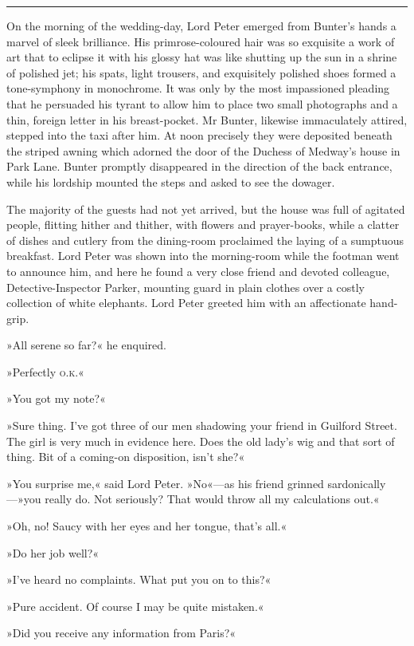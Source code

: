 \noindent\hfil\rule{0.5\textwidth}{.4pt}\hfil 

On the morning of the wedding-day, Lord Peter emerged from Bunter's hands a marvel of sleek brilliance. His primrose-coloured hair was so exquisite a work of art that to eclipse it with his glossy hat was like shutting up the sun in a shrine of polished jet; his spats, light trousers, and exquisitely polished shoes formed a tone-symphony in monochrome. It was only by the most impassioned pleading that he persuaded his tyrant to allow him to place two small photographs and a thin, foreign letter in his breast-pocket. Mr Bunter, likewise immaculately attired, stepped into the taxi after him. At noon precisely they were deposited beneath the striped awning which adorned the door of the Duchess of Medway's house in Park Lane. Bunter promptly disappeared in the direction of the back entrance, while his lordship mounted the steps and asked to see the dowager.

The majority of the guests had not yet arrived, but the house was full of agitated people, flitting hither and thither, with flowers and prayer-books, while a clatter of dishes and cutlery from the dining-room proclaimed the laying of a sumptuous breakfast. Lord Peter was shown into the morning-room while the footman went to announce him, and here he found a very close friend and devoted colleague, Detective-Inspector Parker, mounting guard in plain clothes over a costly collection of white elephants. Lord Peter greeted him with an affectionate hand-grip.

»All serene so far?« he enquired.

»Perfectly \textsc{o.k.}«

»You got my note?«

»Sure thing. I've got three of our men shadowing your friend in Guilford Street. The girl is very much in evidence here. Does the old lady's wig and that sort of thing. Bit of a coming-on disposition, isn't she?«

»You surprise me,« said Lord Peter. »No«—as his friend grinned sardonically—»you really do. Not seriously? That would throw all my calculations out.«

»Oh, no! Saucy with her eyes and her tongue, that's all.«

»Do her job well?«

»I've heard no complaints. What put you on to this?«

»Pure accident. Of course I may be quite mistaken.«

»Did you receive any information from Paris?«

